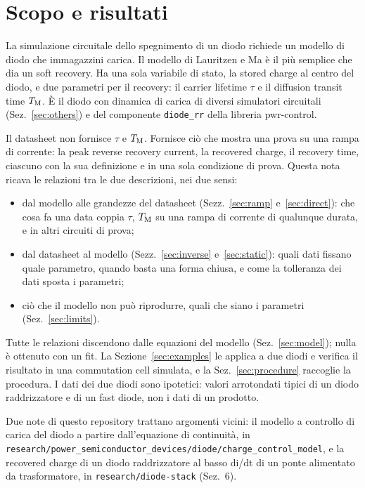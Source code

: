 \documentclass[10pt,a4paper]{scrartcl}
\let\newcommand\lmitdefine
\newcommand{\TM}{T_\mathrm{M}}
\begin{document}

\tableofcontents
\newpage

\section{Scopo e risultati}
\label{sec:scope}
La simulazione circuitale dello spegnimento di un diodo richiede un modello di diodo che immagazzini carica. Il modello di Lauritzen e Ma \cite{lauritzen1991} è il più semplice che dia un soft recovery. Ha una sola variabile di stato, la stored charge al centro del diodo, e due parametri per il recovery: il carrier lifetime $\tau$ e il diffusion transit time $\TM$. È il diodo con dinamica di carica di diversi simulatori circuitali (Sez.~\ref{sec:others}) e del componente \texttt{diode\_rr} della libreria pwr-control.

Il datasheet non fornisce $\tau$ e $\TM$. Fornisce ciò che mostra una prova su una rampa di corrente: la peak reverse recovery current, la recovered charge, il recovery time, ciascuno con la sua definizione e in una sola condizione di prova. Questa nota ricava le relazioni tra le due descrizioni, nei due sensi:
\begin{itemize}
\item dal modello alle grandezze del datasheet (Sezz.~\ref{sec:ramp} e~\ref{sec:direct}): che cosa fa una data coppia $\tau$, $\TM$ su una rampa di corrente di qualunque durata, e in altri circuiti di prova;
\item dal datasheet al modello (Sezz.~\ref{sec:inverse} e~\ref{sec:static}): quali dati fissano quale parametro, quando basta una forma chiusa, e come la tolleranza dei dati sposta i parametri;
\item ciò che il modello non può riprodurre, quali che siano i parametri (Sez.~\ref{sec:limits}).
\end{itemize}
Tutte le relazioni discendono dalle equazioni del modello (Sez.~\ref{sec:model}); nulla è ottenuto con un fit. La Sezione~\ref{sec:examples} le applica a due diodi e verifica il risultato in una commutation cell simulata, e la Sez.~\ref{sec:procedure} raccoglie la procedura. I dati dei due diodi sono ipotetici: valori arrotondati tipici di un diodo raddrizzatore e di un fast diode, non i dati di un prodotto.

Due note di questo repository trattano argomenti vicini: il modello a controllo di carica del diodo a partire dall'equazione di continuità, in \texttt{research/power\_semiconductor\_devices/diode/charge\_control\_model}, e la recovered charge di un diodo raddrizzatore al basso di/dt di un ponte alimentato da trasformatore, in \texttt{research/diode-stack} (Sez.~6).
\end{document}
